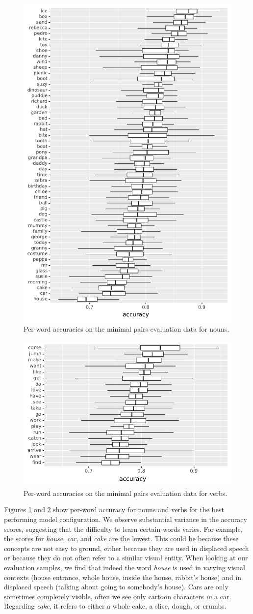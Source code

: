 \begin{figure}[htb]
  \centering
  \includegraphics[width=.5\textwidth]{results/targeted_triplets/acc_per_word_NOUN.pdf}
  \caption{Per-word accuracies on the minimal pairs evaluation data for nouns.}
  \label{fig:accuracy_targeted_triplets_nouns}
\end{figure}

\begin{figure}[htb]
	\centering
	\includegraphics[width=.5\textwidth]{results/targeted_triplets/acc_per_word_VERB.pdf}
	\caption{Per-word accuracies on the minimal pairs evaluation data for 
	verbs.}
	\label{fig:accuracy_targeted_triplets_verbs}
\end{figure}

Figures \ref{fig:accuracy_targeted_triplets_nouns} and 
\ref{fig:accuracy_targeted_triplets_verbs} show per-word
accuracy for nouns and verbs for the best performing model configuration.
We observe substantial variance in the accuracy scores, suggesting that the 
difficulty to learn certain words varies. For example, the 
scores for \textit{house}, \textit{car}, and \textit{cake} are the lowest. This could be 
because these concepts are not easy to ground, either because they are used in 
displaced speech or because they do not often refer to a similar visual entity. 
When looking at our evaluation samples, we find that indeed the word \textit{house} 
is used in varying visual contexts (house entrance, whole house, inside the
house, rabbit's house) and in displaced speech (talking about going 
to somebody's house). Cars are only sometimes completely visible, often we see 
only cartoon characters \textit{in} a car. Regarding \textit{cake}, it refers to either a 
whole cake, a slice, dough, or crumbs.

